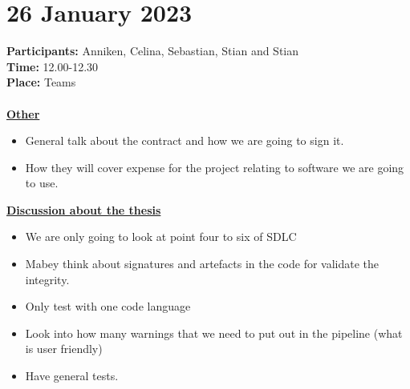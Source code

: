 \section{26 January 2023}
\textbf{Participants:} Anniken, Celina, Sebastian, Stian and Stian \\
\textbf{Time:} 12.00-12.30 \\
\textbf{Place:} Teams
\\~\\
\textbf{\underline{Other}}
\begin{itemize}
    \item General talk about the contract and how we are going to sign it.
    \item How they will cover expense for the project relating to software we are going to use.
\end{itemize}

\textbf{\underline{Discussion about the thesis}}
\begin{itemize}
    \item We are only going to look at point four to six of SDLC
    \item Mabey think about signatures and artefacts in the code for validate the integrity.
    \item Only test with one code language
    \item Look into how many warnings that we need to put out in the pipeline (what is user friendly)
    \item Have general tests.
\end{itemize}